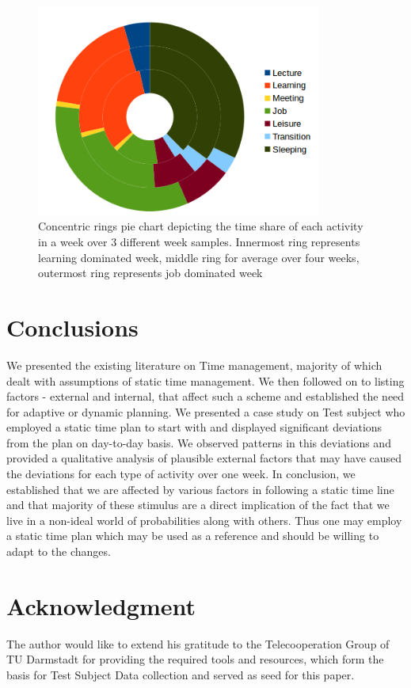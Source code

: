 \documentclass[conference]{IEEEtran}
\begin{document}
\begin{figure}[hb]
  \centering
  \includegraphics[width=3.7in]{donut}
  \caption[]
   {Concentric rings pie chart depicting the time share of each activity in a week over 3 different week samples. Innermost ring represents learning dominated week, middle ring for average over four weeks, outermost ring represents job dominated week}
\end{figure}


\section{Conclusions}
We presented the existing literature on Time management, majority of which dealt with assumptions of static time management. We then followed on to listing factors - external and internal, that affect such a scheme and established the need for adaptive or dynamic planning. We presented a case study on Test subject who employed a static time plan to start with and displayed significant deviations from the plan on day-to-day basis. We observed patterns in this deviations and provided a qualitative analysis of plausible external factors that may have caused the deviations for each type of activity over one week. In conclusion, we established that we are affected by various factors in following a static time line and that majority of these stimulus are a direct implication of the fact that we live in a non-ideal world of probabilities along with others. Thus one may employ a static time plan which may be used as a reference and should be willing to adapt to the changes.

\section*{Acknowledgment}
The author would like to extend his gratitude to the Telecooperation Group of TU Darmstadt for providing the required tools and resources, which form the basis for Test Subject Data collection and served as seed for this paper.
\end{document}
